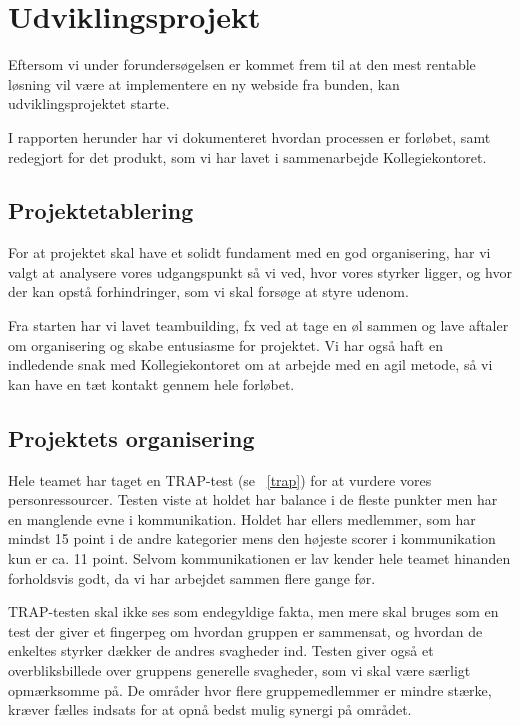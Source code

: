 \documentclass[12pt, a4paper]{report}
\begin{document}

\chapter{Udviklingsprojekt}

Eftersom vi under forundersøgelsen er kommet frem til at den mest rentable løsning vil være at implementere en ny webside fra bunden, kan udviklingsprojektet starte.

I rapporten herunder har vi dokumenteret hvordan processen er forløbet, samt redegjort for det produkt, som vi har lavet i sammenarbejde Kollegiekontoret.

\section{Projektetablering}

For at projektet skal have et solidt fundament med en god organisering, har vi valgt at analysere vores udgangspunkt så vi ved, hvor vores styrker ligger, og hvor der kan opstå forhindringer, som vi skal forsøge at styre udenom.

Fra starten har vi lavet teambuilding, fx ved at tage en øl sammen og lave aftaler om organisering og skabe entusiasme for projektet. Vi har også haft en indledende snak med Kollegiekontoret om at arbejde med en agil metode, så vi kan have en tæt kontakt gennem hele forløbet.

\section{Projektets organisering}

Hele teamet har taget en TRAP-test (se ~\ref{trap}) for at vurdere vores personressourcer. Testen viste at holdet har balance i de fleste punkter men har en manglende evne i kommunikation. Holdet har ellers medlemmer, som har mindst 15 point i de andre kategorier mens den højeste scorer i kommunikation kun er ca. 11 point. Selvom kommunikationen er lav kender hele teamet hinanden forholdsvis godt, da vi har arbejdet sammen flere gange før.

TRAP-testen skal ikke ses som endegyldige fakta, men mere skal bruges som en test der giver et fingerpeg om hvordan gruppen er sammensat, og hvordan de enkeltes styrker dækker de andres svagheder ind. Testen giver også et overbliksbillede over gruppens generelle svagheder, som vi skal være særligt opmærksomme på. De områder hvor flere gruppemedlemmer er mindre stærke, kræver fælles indsats for at opnå bedst mulig synergi på området.
\end{document}
